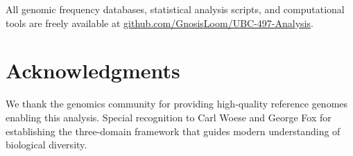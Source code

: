 \documentclass[9pt,twocolumn,twoside,lineno]{pnas-new}
\begin{document}
All genomic frequency databases, statistical analysis scripts, and computational tools are freely available at \href{https://github.com/GnosisLoom/UBC-497-Analysis}{github.com/GnosisLoom/UBC-497-Analysis}.

\section*{Acknowledgments}

We thank the genomics community for providing high-quality reference genomes enabling this analysis. Special recognition to Carl Woese and George Fox for establishing the three-domain framework that guides modern understanding of biological diversity.


\end{document}
